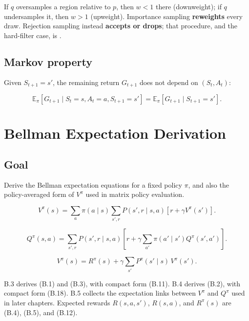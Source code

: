 If $q$ oversamples a region relative to $p$, then $w<1$ there (downweight); if $q$ undersamples it, then $w>1$ (upweight). Importance sampling \textbf{reweights} every draw. Rejection sampling instead \textbf{accepts or drops}; that procedure, and the hard-filter case, is .

\section{Markov property}

Given $S_{t+1}=s'$, the remaining return $G_{t+1}$ does not depend on $(S_t,A_t)$:

\begin{equation}
\mathbb{E}_\pi[G_{t+1}\mid S_t=s,A_t=a,S_{t+1}=s']
=
\mathbb{E}_\pi[G_{t+1}\mid S_{t+1}=s'].
\tag{A.11}
\end{equation}

\chapter{Bellman Expectation Derivation}\label{app:B}

\section*{Goal}

Derive the Bellman expectation equations for a fixed policy $\pi$, and also the policy-averaged form of $V^\pi$ used in matrix policy evaluation.

\begin{equation}
V^\pi(s)
=
\sum_{a}
\pi(a \mid s)
\sum_{s',r}
P(s',r \mid s,a)
\left[
r + \gamma V^\pi(s')
\right].
\tag{B.1}\label{eq:B.1}
\end{equation}

\begin{equation}
Q^\pi(s,a)
=
\sum_{s',r}
P(s',r \mid s,a)
\left[
r + \gamma \sum_{a'} \pi(a' \mid s') Q^\pi(s',a')
\right].
\tag{B.2}\label{eq:B.2}
\end{equation}

\begin{equation}
V^\pi(s)
=
R^\pi(s)
+
\gamma
\sum_{s'}
P^\pi(s' \mid s)\, V^\pi(s').
\tag{B.3}\label{eq:B.3}
\end{equation}

B.3 derives (B.1) and (B.3), with compact form (B.11). B.4 derives (B.2), with compact form (B.18). B.5 collects the expectation links between $V^\pi$ and $Q^\pi$ used in later chapters. Expected rewards $R(s,a,s')$, $R(s,a)$, and $R^\pi(s)$ are (B.4), (B.5), and (B.12).

